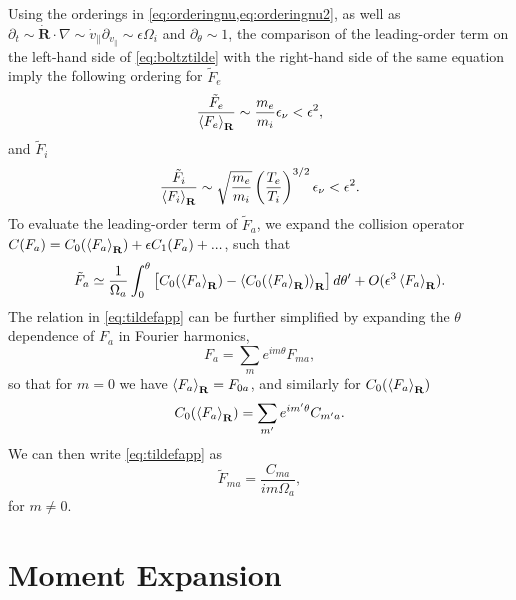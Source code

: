 {Using the orderings in \cref{eq:orderingnu,eq:orderingnu2}, as well as $\partial_t \sim \dot{\mathbf R} \cdot \nabla \sim \dot v_\parallel \partial_{v_\parallel} \sim \epsilon \Omega_i$ and $
\partial_\theta \sim 1$, the comparison of the leading-order term on the left-hand side of \cref{eq:boltztilde} with the right-hand side of the same equation imply the following ordering for $\tilde F_e$
%
\begin{equation}
    \frac{\tilde F_e}{\left< F_e \right>_{\mathbf R}} \sim \frac{m_e}{m_i}\epsilon_\nu< \epsilon^2,
    \label{eq:orderingftildee}
\end{equation}
%
and $\tilde F_i$
%
\begin{equation}
    \frac{\tilde F_i}{\left< F_i \right>_{\mathbf R}} \sim \sqrt{\frac{m_e}{m_i}}\left(\frac{T_e}{T_i}\right)^{3/2}\epsilon_\nu < \epsilon^2.
    \label{eq:orderingftildei}
\end{equation}
%
To evaluate the leading-order term of $\tilde F_a$, we expand the collision operator $C(F_a) = C_0(\left< F_a\right>_{\mathbf R}) + \epsilon C_1(F_a) + ...$, such that
%
\begin{equation}
    \tilde F_a \simeq \frac{1}{\Omega_a}\int_0^\theta\left[C_0(\left< F_a \right>_{\mathbf R} )-\left< C_0( \left< F_a \right>_{\mathbf R})\right>_{\mathbf R}\right]d\theta' + O( \epsilon^3 \left< F_a \right>_{\mathbf R}).
    \label{eq:tildefapp}
\end{equation}
%
The relation in \cref{eq:tildefapp} can be further simplified by expanding the $\theta$ dependence of $F_a$ in Fourier harmonics, 
%
\begin{equation}
    F_a=\sum_m e^{i m \theta} F_{m a},
    \label{eq:fourftilde}
\end{equation}
%
so that for $m=0$ we have $\left< F_a \right>_{\mathbf R} = F_{0a}$, and similarly for $C_0(\left< F_a \right>_{\mathbf R})$
%
\begin{equation}
    C_0(\left< F_a \right>_{\mathbf R}) = \sum_{m'} e^{i m' \theta} C_{m' a}.
\end{equation}
%
We can then write \cref{eq:tildefapp} as
%
\begin{equation}
    \tilde F_{m a} = \frac{C_{m a}}{i m \Omega_a},
    \label{eq:fmacmafourier}
\end{equation}
%
for $m \not=0$.

\section{Moment Expansion}
\label{sec:momentexpansion}

}
